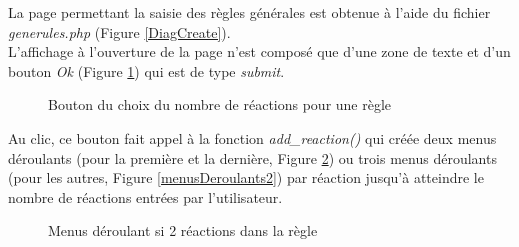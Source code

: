 La page permettant la saisie des règles générales est obtenue à l'aide du fichier \emph{generules.php} (Figure \ref{DiagCreate}).\\
L'affichage à l'ouverture de la page n'est composé que d'une zone de texte et d'un bouton \emph{Ok} (Figure \ref{boutonOK}) qui est de type \textit{submit}. 

\begin{figure}[!ht]
	\begin{center}
		\caption{Bouton du choix du nombre de réactions pour une règle}
  		\label{boutonOK}
  	\end{center}	
\end{figure}

Au clic, ce bouton fait appel à la fonction \emph{add\_reaction()} qui créée  deux menus déroulants (pour la première et la dernière, Figure \ref{menusDeroulants1}) ou trois menus déroulants (pour les autres, Figure \ref{menusDeroulants2}) par réaction jusqu'à atteindre le nombre de réactions entrées par l'utilisateur. 

\begin{figure}[!ht]
	\begin{center}
		\caption{Menus déroulant si 2 réactions dans la règle}
  		\label{menusDeroulants1}
  	\end{center}	
\end{figure}

